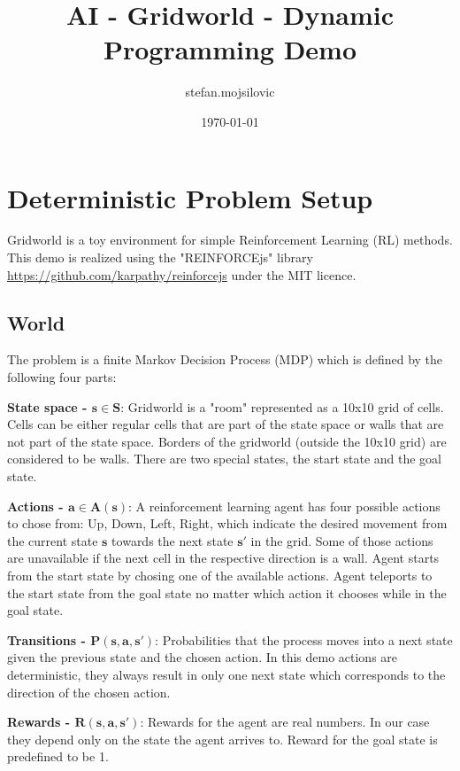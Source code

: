 \documentclass{article}
\title{AI - Gridworld - Dynamic Programming Demo}
\author{stefan.mojsilovic}
\date{\today}
\begin{document}
\maketitle

\nopagebreak

\section{Deterministic Problem Setup}
Gridworld is a toy environment for simple Reinforcement Learning (RL) methods. This demo is realized using the "REINFORCEjs" library \href{url}{https://github.com/karpathy/reinforcejs} under the MIT licence. 

\subsection{World}

The problem is a finite Markov Decision Process (MDP) which is defined by the following four parts:

\textbf{State space - $ \boldsymbol{s \in S} $}: Gridworld is a "room" represented as a 10x10 grid of cells. Cells can be either regular cells that are part of the state space or walls that are not part of the state space. Borders of the gridworld (outside the 10x10 grid) are considered to be walls. There are two special states, the start state and the goal state.

\textbf{Actions -  $ \boldsymbol{a \in A\left( s \right) } $}: A reinforcement learning agent has four possible actions to chose from: Up, Down, Left, Right, which indicate the desired movement from the current state $\boldsymbol{s}$ towards the next state $\boldsymbol{s'}$ in the grid. Some of those actions are unavailable if the next cell in the respective direction is a wall. Agent starts from the start state by chosing one of the available actions. Agent teleports to the start state from the goal state no matter which action it chooses while in the goal state.

\textbf{Transitions -  $ \boldsymbol{P \left( s, a ,s' \right)} $}: Probabilities that the process moves into a next state given the previous state and the chosen action. In this demo actions are deterministic, they always result in only one next state which corresponds to the direction of the chosen action. 

\textbf{Rewards -  $ \boldsymbol{R \left( s, a, s' \right)} $}: Rewards for the agent are real numbers. In our case they depend only on the state the agent arrives to. Reward for the goal state is predefined to be 1.
\end{document}
